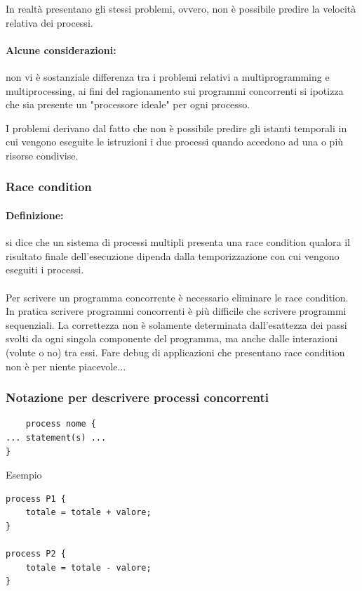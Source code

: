 In realtà presentano gli stessi problemi, ovvero, non è possibile predire la velocità relativa dei processi.

\paragraph{Alcune considerazioni:} non vi è sostanziale differenza tra i problemi relativi a multiprogramming e multiprocessing, ai fini del ragionamento sui programmi concorrenti si ipotizza che sia
presente un "processore ideale" per ogni processo.

I problemi derivano dal fatto che non è possibile predire gli istanti temporali in cui vengono eseguite le istruzioni i due processi quando accedono ad una o più risorse condivise.

\subsubsection{Race condition}
\paragraph{Definizione:}si dice che un sistema di processi multipli presenta una race condition qualora il risultato finale dell'esecuzione dipenda dalla temporizzazione con cui vengono eseguiti i processi.
\paragraph{}
Per scrivere un programma concorrente è necessario eliminare le race condition.
\newline
In pratica scrivere programmi concorrenti è più difficile che scrivere programmi sequenziali.
La correttezza non è solamente determinata dall'esattezza dei passi
svolti da ogni singola componente del programma, ma anche dalle
interazioni (volute o no) tra essi.
Fare debug di applicazioni che presentano race condition non
è per niente piacevole...

\subsubsection{Notazione per descrivere processi concorrenti}

\begin{lstlisting}
    process nome {
... statement(s) ...
}
\end{lstlisting}

Esempio

\begin{lstlisting}
process P1 {
    totale = totale + valore;
}

process P2 {
    totale = totale - valore;
}
\end{lstlisting}

